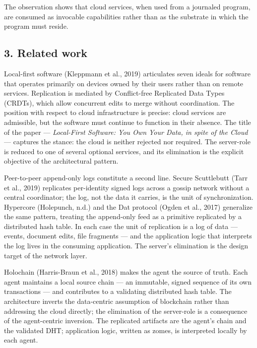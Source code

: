 \documentclass[
]{article}
\begin{document}
The observation shows that cloud services, when used from a journaled
program, are consumed as invocable capabilities rather than as the
substrate in which the program must reside.

\subsection{3. Related work}\label{related-work}

Local-first software (Kleppmann et al., 2019) articulates seven ideals
for software that operates primarily on devices owned by their users
rather than on remote services. Replication is mediated by Conflict-free
Replicated Data Types (CRDTs), which allow concurrent edits to merge
without coordination. The position with respect to cloud infrastructure
is precise: cloud services are admissible, but the software must
continue to function in their absence. The title of the paper ---
\emph{Local-First Software: You Own Your Data, in spite of the Cloud}
--- captures the stance: the cloud is neither rejected nor required. The
server-role is reduced to one of several optional services, and its
elimination is the explicit objective of the architectural pattern.

Peer-to-peer append-only logs constitute a second line. Secure
Scuttlebutt (Tarr et al., 2019) replicates per-identity signed logs
across a gossip network without a central coordinator; the log, not the
data it carries, is the unit of synchronization. Hypercore (Holepunch,
n.d.) and the Dat protocol (Ogden et al., 2017) generalize the same
pattern, treating the append-only feed as a primitive replicated by a
distributed hash table. In each case the unit of replication is a log of
data --- events, document edits, file fragments --- and the application
logic that interprets the log lives in the consuming application. The
server's elimination is the design target of the network layer.

Holochain (Harris-Braun et al., 2018) makes the agent the source of
truth. Each agent maintains a local source chain --- an immutable,
signed sequence of its own transactions --- and contributes to a
validating distributed hash table. The architecture inverts the
data-centric assumption of blockchain rather than addressing the cloud
directly; the elimination of the server-role is a consequence of the
agent-centric inversion. The replicated artifacts are the agent's chain
and the validated DHT; application logic, written as zomes, is
interpreted locally by each agent.
\end{document}
